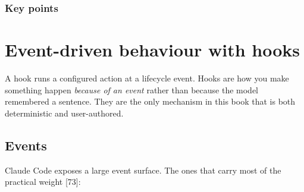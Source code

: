 \documentclass[11pt,a4paper,twoside,openany]{book}
\newcommand{\chaptertitlelabel}{}
\begin{document}
  \subsection*{Key points}
  \begin{itemize}\kprows\end{itemize}
\else
  \noindent\kpbody
\fi
\par\addvspace{1.4mm}
\endgroup


\FloatBarrier
\renewcommand{\chaptertitlelabel}{Part IV \textperiodcentered\ Chapter 17}
\setcounter{chapter}{16}
\chapter{Event-driven behaviour with hooks}

A hook runs a configured action at a lifecycle event. Hooks are how you make something happen \emph{because of an event} rather than because the model remembered a sentence. They are the only mechanism in this book that is both deterministic and user-authored.


\FloatBarrier
\setcounter{section}{0}
\section{Events}

Claude Code exposes a large event surface. The ones that carry most of the practical weight [73]:
\end{document}
